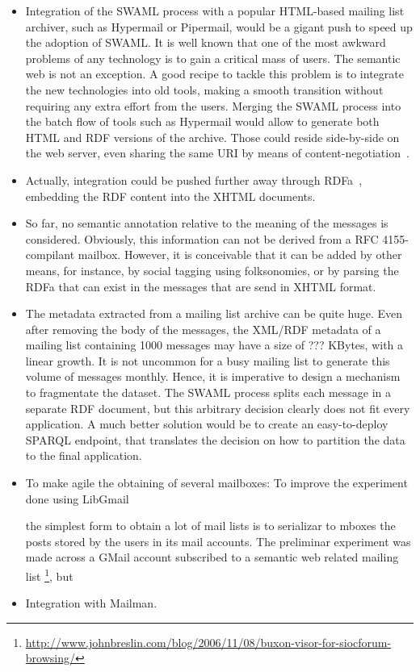 \documentclass{llncs}
\begin{document}
\begin{itemize}
  \item Integration of the SWAML process with a popular HTML-based
        mailing list archiver, such as Hypermail or Pipermail, would be
        a gigant push to speed up the adoption of SWAML. It is well
        known that one of the most awkward problems of any technology
        is to gain a critical mass of users. The semantic web is not
        an exception. A good recipe to tackle this problem is to
        integrate the new technologies into old tools, making
        a smooth transition without requiring any extra effort from
        the users. Merging the SWAML process into the batch flow of
        tools such as Hypermail would allow to generate both
        HTML and RDF versions of the archive. Those could reside
        side-by-side on the web server, even sharing the same URI
        by means of content-negotiation~\cite{Recipes}.
  \item Actually, integration could be pushed further away through
        RDFa~\cite{Birbeck2006}, embedding the RDF content into the
        XHTML documents.
  \item So far, no semantic annotation relative to the meaning of
        the messages is considered. Obviously, this information can not
        be derived from a RFC 4155-compilant mailbox. However, it is
        conceivable that it can be added by other means, for instance,
        by social tagging using folksonomies, or by parsing the RDFa
        that can exist in the messages that are send in XHTML format.
  \item The metadata extracted from a mailing list archive can be
        quite huge. Even after removing the body of the messages, the
        XML/RDF metadata of a mailing list containing 1000 messages may
        have a size of ??? KBytes, with a linear growth. It is not uncommon
        for a busy mailing list to generate this volume of messages
        monthly. Hence, it is imperative to design a mechanism to
        fragmentate the dataset. The SWAML process splits each message
        in a separate RDF document, but this arbitrary decision clearly
        does not fit every application. A much better solution would be to
        create an easy-to-deploy SPARQL endpoint\cite{SPARQL},
        that translates the
        decision on how to partition the data to the final application.
  \item To make agile the obtaining of several mailboxes:
	To improve the experiment done using LibGmail
	
	the simplest form to obtain a lot of mail lists is to serializar to mboxes 
	the posts stored by the users in its mail accounts. The preliminar experiment 
	was made across a GMail account subscribed to a semantic web related mailing list
	\footnote{\url{http://www.johnbreslin.com/blog/2006/11/08/buxon-visor-for-siocforum-browsing/}},
	but 
  \item Integration with Mailman.
\end{itemize}

%



%
\end{document}
